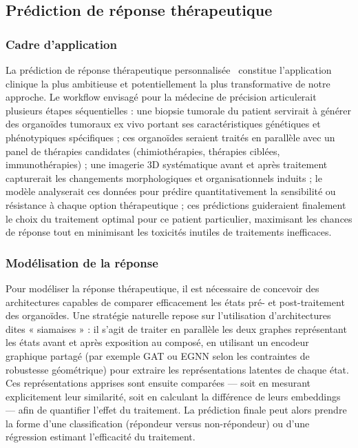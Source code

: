\subsection{Prédiction de réponse thérapeutique}

\subsubsection{Cadre d'application}

La prédiction de réponse thérapeutique personnalisée~\cite{Drost2019,Sachs2018} constitue l'application clinique la plus ambitieuse et potentiellement la plus transformative de notre approche. Le workflow envisagé pour la médecine de précision articulerait plusieurs étapes séquentielles : une biopsie tumorale du patient servirait à générer des organoïdes tumoraux ex vivo portant ses caractéristiques génétiques et phénotypiques spécifiques ; ces organoïdes seraient traités en parallèle avec un panel de thérapies candidates (chimiothérapies, thérapies ciblées, immunothérapies) ; une imagerie 3D systématique avant et après traitement capturerait les changements morphologiques et organisationnels induits ; le modèle analyserait ces données pour prédire quantitativement la sensibilité ou résistance à chaque option thérapeutique ; ces prédictions guideraient finalement le choix du traitement optimal pour ce patient particulier, maximisant les chances de réponse tout en minimisant les toxicités inutiles de traitements inefficaces.

\subsubsection{Modélisation de la réponse}

Pour modéliser la réponse thérapeutique, il est nécessaire de concevoir des architectures capables de comparer efficacement les états pré- et post-traitement des organoïdes. Une stratégie naturelle repose sur l'utilisation d'architectures dites « siamaises » : il s'agit de traiter en parallèle les deux graphes représentant les états avant et après exposition au composé, en utilisant un encodeur graphique partagé (par exemple GAT ou EGNN selon les contraintes de robustesse géométrique) pour extraire les représentations latentes de chaque état. Ces représentations apprises sont ensuite comparées — soit en mesurant explicitement leur similarité, soit en calculant la différence de leurs embeddings — afin de quantifier l'effet du traitement. La prédiction finale peut alors prendre la forme d'une classification (répondeur versus non-répondeur) ou d'une régression estimant l'efficacité du traitement.

